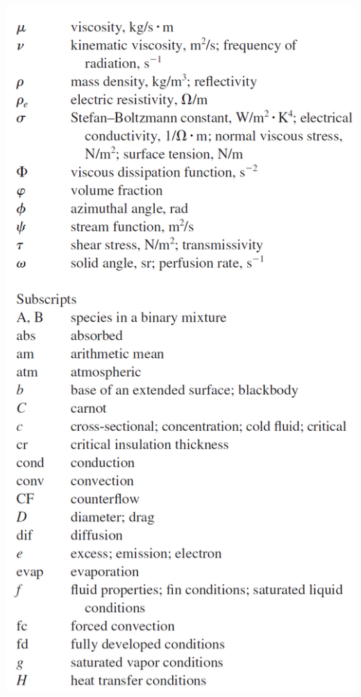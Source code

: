 \documentclass[10pt,landscape]{article}
\newenvironment{Figure}
     {\par\medskip\noindent\minipage{\linewidth}}
     {\endminipage\par\medskip}
\begin{document}
\begin{multicols}{3}
\begin{Figure}
    \includegraphics[width=\linewidth]{Symbols_7.png}
\end{Figure}
\begin{Figure}
    \centering

\end{Figure}
\end{multicols}
\end{document}
